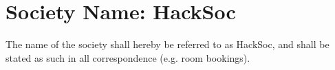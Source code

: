 \section*{Society Name: HackSoc}
\begin{clause}
  The name of the society shall hereby be referred to as HackSoc, and shall be stated as such in all correspondence (e.g. room bookings).
\end{clause}
  